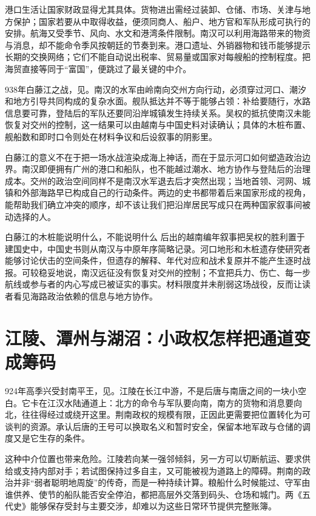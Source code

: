 港口生活让国家财政显得尤其具体。货物进出需经过装卸、仓储、市场、关津与地方保护；国家若要从中取得收益，便须同商人、船户、地方官和军队形成可执行的安排。航海又受季节、风向、水文和港湾条件限制。南汉可以利用海路带来的物资与消息，却不能命令季风按朝廷的节奏到来。港口遗址、外销器物和钱币能够提示长期的交换网络；它们不能自动说出税率、贸易量或国家对每艘船的控制程度。把海贸直接等同于“富国”，便跳过了最关键的中介。

938年白藤江之战，见。南汉的水军由岭南向交州方向行动，必须穿过河口、潮汐和地方引导共同构成的复杂水面。舰队抵达并不等于能够占领：补给要随行，水路信息要可靠，登陆后的军队还要同沿岸城镇发生持续关系。吴权的抵抗使南汉未能恢复对交州的控制，这一结果可以由越南与中国史料对读确认；具体的木桩布置、舰船数和即时口令则处在材料争议和后设叙事的阴影里。

白藤江的意义不在于把一场水战渲染成海上神话，而在于显示河口如何塑造政治边界。南汉即便拥有广州的港口和船队，也不能越过潮水、地方协作与登陆后的治理成本。交州的政治空间同样不是南汉水军退去后才突然出现；当地首领、河网、城镇和外部海路早已构成自己的行动条件。两边的史书都带着后来国家形成的视角，能帮助我们确立冲突的顺序，却不该让我们把沿岸居民写成只在两种国家叙事间被动选择的人。

\begin{debate}{白藤江的木桩能说明什么，不能说明什么}
后出的越南编年叙事把吴权的胜利置于建国史中，中国史书则从南汉与中原年序简略记录。河口地形和木桩遗存使研究者能够讨论伏击的空间条件，但遗存的解释、年代对应和战术复原并不能产生逐时战报。可较稳妥地说，南汉远征没有恢复对交州的控制；不宜把兵力、伤亡、每一步航线或参与者的内心写成已被证实的事实。材料限度并未削弱这场战役，反而让读者看见海路政治依赖的信息与地方协作。
\end{debate}

\section{江陵、潭州与湖沼：小政权怎样把通道变成筹码}

924年高季兴受封南平王，见。江陵在长江中游，不是后唐与南唐之间的一块小空白。它卡在江汉水陆通道上：北方的命令与军队要向南，南方的货物和消息要向北，往往得经过或绕开这里。荆南政权的规模有限，正因此更需要把位置转化为可谈判的资源。承认后唐的王号可以换取名义和暂时安全，保留本地军政与仓储的调度又是它生存的条件。

这种中介位置也带来危险。江陵若向某一强邻倾斜，另一方可以切断航运、要求供给或支持内部对手；若试图保持过多自主，又可能被视为道路上的障碍。荆南的政治并非“弱者聪明地周旋”的传奇，而是一种持续计算。粮船什么时候能过、守军由谁供养、使节的船队能否安全停泊，都把高层外交落到码头、仓场和城门。两《五代史》能够保存受封与主要交涉，却难以为这些日常环节提供完整账簿。

